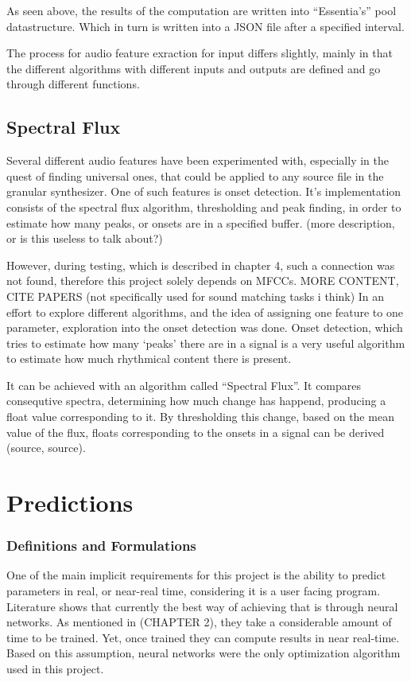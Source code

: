 As seen above, the results of the computation are written into
``Essentia's'' pool datastructure. Which in turn is written into a
JSON file after a specified interval.

The process for audio feature exraction for input differs slightly,
mainly in that the different algorithms with different inputs and
outputs are defined and go through different functions.

\subsection{Spectral Flux}
Several different audio features have been experimented with,
especially in the quest of finding universal ones, that could be
applied to any source file in the granular synthesizer. One of such
features is onset detection. It's implementation consists of the
spectral flux algorithm, thresholding and peak finding, in order to
estimate how many peaks, or onsets are in a specified buffer. (more
description, or is this useless to talk about?)

However, during testing, which is described in chapter 4, such a
connection was not found, therefore this project solely depends on MFCCs.
%
MORE CONTENT, CITE PAPERS (not specifically used for sound matching
tasks i think)
In an effort to explore different algorithms, and the idea of
assigning one feature to one parameter, exploration into the
onset detection was done.
Onset detection, which tries to estimate how many `peaks' there are
in a signal is a very useful algorithm to estimate how much rhythmical
content there is present.

It can be achieved with an algorithm called ``Spectral Flux''. It
compares consequtive spectra, determining how much change has happend,
producing a float value corresponding to it. By thresholding this
change, based on the mean value of the flux, floats corresponding to
the onsets in a signal can be derived (source, source).

\section{Predictions}
\subsubsection{Definitions and Formulations}
One of the main implicit requirements for this project is the ability
to predict parameters in real, or near-real time, considering it is a
user facing program. Literature shows that currently the best way of
achieving that is through neural
networks\cite{yee-king_automatic_2018}. As mentioned in (CHAPTER 2),
they take a considerable amount of time to be trained. Yet, once
trained they can compute results in near real-time. Based on this
assumption, neural networks were the only optimization algorithm used
in this project.

